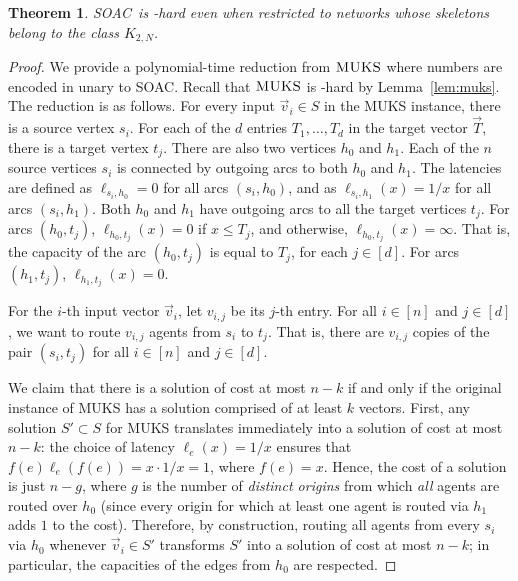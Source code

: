 \documentclass[letterpaper]{article} %
\newtheorem{theorem}{Theorem}
\newcommand{\problem}{{\sc SOAC}\xspace} %
\begin{document}
\begin{theorem}
\label{hard-vc}
\problem\ is \NP-hard even when restricted to networks whose skeletons belong to the class $K_{2,N}$.
\end{theorem}


\begin{proof}
We provide a polynomial-time reduction from $\textsc{MUKS}$ where numbers are encoded in unary to \problem. Recall that $\textsc{MUKS}$ is \NP-hard by Lemma~\ref{lem:muks}. The reduction is as follows.
For every input $\vec v_i \in S$ in the MUKS instance, there is a source vertex $s_i$.
For each of the $d$ entries $T_1,\ldots,T_d$ in the target vector $\vec{T}$, there is a target vertex $t_j$.
There are also two vertices $h_0$ and $h_1$.
Each of the $n$ source vertices $s_i$ is connected by outgoing arcs to both $h_0$ and $h_1$.
The latencies are defined as $\ell_{s_i,h_0} = 0$ for all arcs $(s_i,h_0)$, and as $\ell_{s_i,h_1}(x) = 1/x$ for all arcs $(s_i, h_1)$.
Both $h_0$ and $h_1$ have outgoing arcs to all the target vertices $t_j$. For arcs $(h_0,t_j)$,
$\ell_{h_0,t_j}(x) = 0$ if $x \leq T_j$, and otherwise, $\ell_{h_0,t_j}(x) = \infty$.
That is, the capacity of the arc $(h_0, t_j)$ is equal to $T_j$, for each $j\in [d]$.
For arcs $(h_1,t_j)$, $\ell_{h_1,t_j}(x) = 0$.

For the $i$-th input vector $\vec{v}_i$, let $v_{i,j}$ be its $j$-th entry.
For all $i\in [n]$ and $j\in [d]$,
we want to route $v_{i,j}$ agents from $s_i$ to $t_j$.
That is, there are $v_{i,j}$ copies of the pair $(s_i, t_j)$ for all $i\in [n]$ and $j\in [d]$.

We claim that there is a solution of cost at most $n-k$ if and only if the original instance of \textsc{MUKS} has a solution comprised of at least $k$ vectors. First, any solution $S'\subset S$ for \textsc{MUKS} translates immediately into a solution of cost at most $n-k$:
the choice of latency $\ell_e(x) = 1/x$ ensures that $f(e) \ell_e(f(e)) = x \cdot 1/x = 1$, where $f(e) = x$.
Hence, the cost of a solution is just $n-g$, where $g$ is the number of \emph{distinct origins} from which \emph{all} agents are routed over $h_0$ (since every origin for which at least one agent is routed via $h_1$ adds $1$ to the cost).
Therefore, by construction, routing all agents from every $s_i$ via $h_0$ whenever $\vec v_i \in S'$ transforms $S'$ into a solution of cost at most $n-k$; in particular, the capacities of the edges from $h_0$ are respected.


\end{proof}
\end{document}
